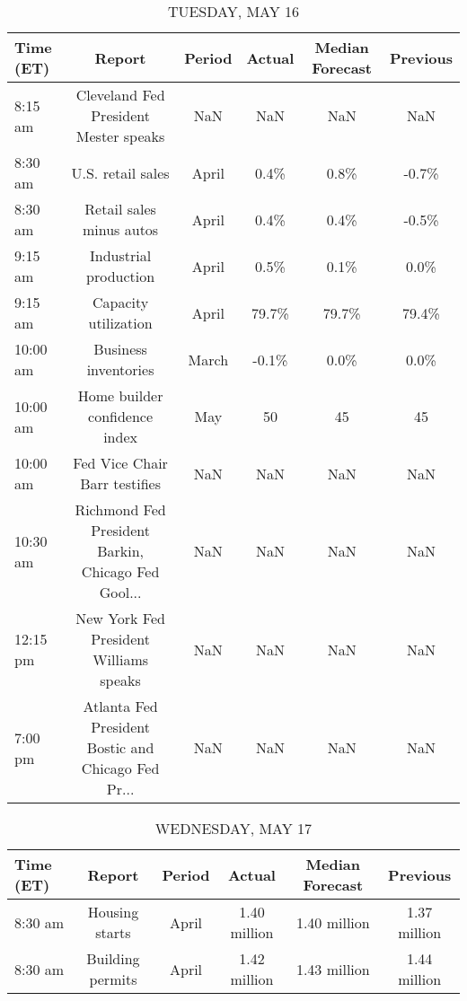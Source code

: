 \documentclass{article}%
\begin{document}
\begin{table}[htbp]%
\caption{TUESDAY, MAY 16}%
\centering%
\begin{adjustbox}{width=1\textwidth}%
\begin{tabular}{lccccc}
\toprule
Time (ET) &                                             Report & Period & Actual & Median Forecast & Previous \\
\midrule
  8:15 am &              Cleveland Fed President Mester speaks &    NaN &    NaN &             NaN &      NaN \\
  8:30 am &                                  U.S. retail sales &  April &   0.4\% &            0.8\% &    -0.7\% \\
  8:30 am &                           Retail sales minus autos &  April &   0.4\% &            0.4\% &    -0.5\% \\
  9:15 am &                              Industrial production &  April &   0.5\% &            0.1\% &     0.0\% \\
  9:15 am &                               Capacity utilization &  April &  79.7\% &           79.7\% &    79.4\% \\
 10:00 am &                               Business inventories &  March &  -0.1\% &            0.0\% &     0.0\% \\
 10:00 am &                      Home builder confidence index &    May &     50 &              45 &       45 \\
 10:00 am &                      Fed Vice Chair Barr testifies &    NaN &    NaN &             NaN &      NaN \\
 10:30 am & Richmond Fed President Barkin, Chicago Fed Gool... &    NaN &    NaN &             NaN &      NaN \\
 12:15 pm &             New York Fed President Williams speaks &    NaN &    NaN &             NaN &      NaN \\
  7:00 pm & Atlanta Fed President Bostic and Chicago Fed Pr... &    NaN &    NaN &             NaN &      NaN \\
\bottomrule
\end{tabular}
%
\end{adjustbox}%
\end{table}

%


\begin{table}[htbp]%
\caption{WEDNESDAY, MAY 17}%
\centering%
\begin{adjustbox}{width=1\textwidth}%
\begin{tabular}{lccccc}
\toprule
Time (ET) &           Report & Period &       Actual & Median Forecast &     Previous \\
\midrule
  8:30 am &   Housing starts &  April & 1.40 million &    1.40 million & 1.37 million \\
  8:30 am & Building permits &  April & 1.42 million &    1.43 million & 1.44 million \\
\bottomrule
\end{tabular}
%
\end{adjustbox}%
\end{table}
\end{document}
